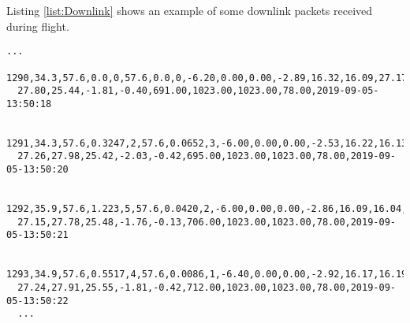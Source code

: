 Listing \ref{list:Downlink} shows an example of some downlink packets received during flight.
\begin{small}
  \begin{lstlisting}[caption = Sample of downlinked data packets. The line breaks within each packet was not present in the actual data and are shown here to clearly show the packet., label={list:Downlink}]
  ...
  1290,34.3,57.6,0.0,0,57.6,0.0,0,-6.20,0.00,0.00,-2.89,16.32,16.09,27.17,
  27.80,25.44,-1.81,-0.40,691.00,1023.00,1023.00,78.00,2019-09-05-13:50:18
  
  1291,34.3,57.6,0.3247,2,57.6,0.0652,3,-6.00,0.00,0.00,-2.53,16.22,16.13,
  27.26,27.98,25.42,-2.03,-0.42,695.00,1023.00,1023.00,78.00,2019-09-05-13:50:20
  
  1292,35.9,57.6,1.223,5,57.6,0.0420,2,-6.00,0.00,0.00,-2.86,16.09,16.04,
  27.15,27.78,25.48,-1.76,-0.13,706.00,1023.00,1023.00,78.00,2019-09-05-13:50:21
  
  1293,34.9,57.6,0.5517,4,57.6,0.0086,1,-6.40,0.00,0.00,-2.92,16.17,16.19,
  27.24,27.91,25.55,-1.81,-0.42,712.00,1023.00,1023.00,78.00,2019-09-05-13:50:22
  ...
  \end{lstlisting}
\end{small}
